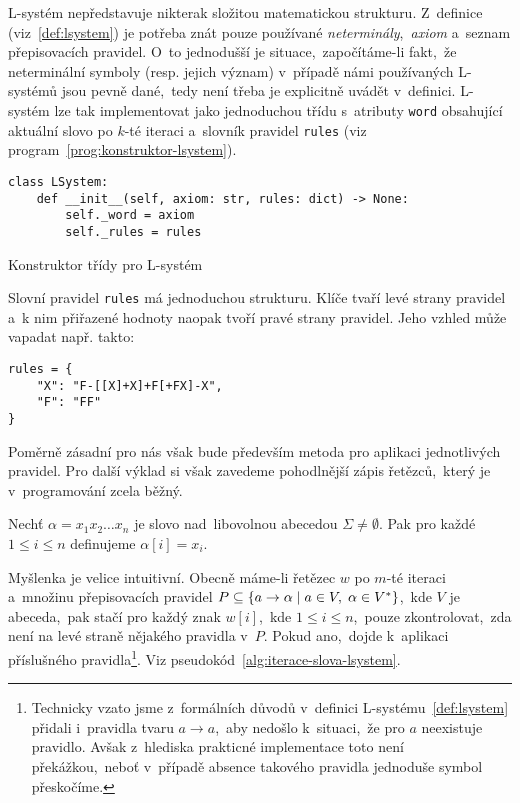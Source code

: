 L-systém nepředstavuje nikterak složitou matematickou strukturu. Z~definice (viz~\ref{def:lsystem}) je potřeba znát pouze používané \emph{neterminály},~\emph{axiom} a~seznam přepisovacích pravidel. O~to jednodušší je situace,~započítáme-li fakt,~že neterminální symboly (resp. jejich význam) v~případě námi používaných L-systémů jsou pevně dané,~tedy není třeba je explicitně uvádět v~definici. L-systém lze tak implementovat jako jednoduchou třídu s~atributy \texttt{word} obsahující aktuální slovo po $k$-té iteraci a~slovník pravidel \texttt{rules} (viz program~\ref{prog:konstruktor-lsystem}).
\begin{program}[h]
    \begin{lstlisting}[style=python]
class LSystem:
    def __init__(self, axiom: str, rules: dict) -> None:
        self._word = axiom
        self._rules = rules
\end{lstlisting}
    \caption{Konstruktor třídy pro L-systém}
    \label{prog:konstruktor-lsystem}
\end{program}
Slovní pravidel \texttt{rules} má jednoduchou strukturu. Klíče tvaří levé strany pravidel a~k nim přiřazené hodnoty naopak tvoří pravé strany pravidel. Jeho vzhled může vapadat např. takto:
\begin{verbatim}
rules = {
    "X": "F-[[X]+X]+F[+FX]-X",
    "F": "FF"
}
\end{verbatim}
Poměrně zásadní pro nás však bude především metoda pro aplikaci jednotlivých pravidel. Pro další výklad si však zavedeme pohodlnější zápis řetězců,~který je v~programování zcela běžný.
\begin{definition}\label{def:index-retezce}
    Nechť $\alpha=x_1x_2\ldots x_n$ je slovo nad~libovolnou abecedou $\Sigma\neq\emptyset$. Pak pro každé $1\leqslant i\leqslant n$ definujeme $\alpha[i]=x_i$.
\end{definition}
Myšlenka je velice intuitivní. Obecně máme-li řetězec $w$ po $m$-té iteraci a~množinu přepisovacích pravidel $P\subseteq\left\{a\to\alpha\mid a\in V,\;\alpha\in V^*\right\}$,~kde $V$ je abeceda,~pak stačí pro každý znak $w[i]$,~kde $1\leqslant i\leqslant n$,~pouze zkontrolovat,~zda není na levé straně nějakého pravidla v~$P$. Pokud ano,~dojde k~aplikaci příslušného pravidla\footnote{Technicky vzato jsme z~formálních důvodů v~definici L-systému~\ref{def:lsystem} přidali i~pravidla tvaru $a\to a$,~aby nedošlo k~situaci,~že pro $a$ neexistuje pravidlo. Avšak z~hlediska prakticné implementace toto není překážkou,~neboť v~případě absence takového pravidla jednoduše symbol přeskočíme.}. Viz pseudokód~\ref{alg:iterace-slova-lsystem}.
